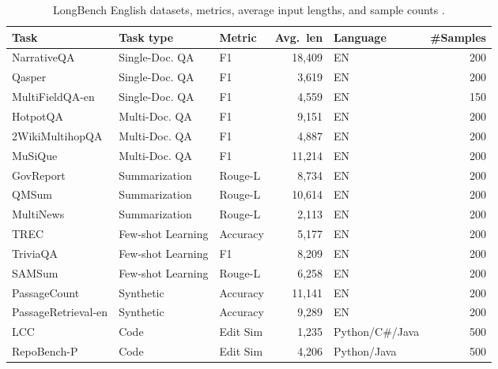 \documentclass{article} %
\begin{document}
\begin{table}[t]
\caption{LongBench English datasets, metrics, average input lengths, and sample counts \citep{bai2024longbench}.}
\label{tab:longbench_datasets}
\centering
\begin{tabular}{lllrlr}
\toprule
Task & Task type & Metric & Avg.\ len & Language & \#Samples \\
\midrule
NarrativeQA & Single-Doc. QA & F1 & 18{,}409 & EN & 200 \\
Qasper & Single-Doc. QA & F1 & 3{,}619 & EN & 200 \\
MultiFieldQA-en & Single-Doc. QA & F1 & 4{,}559 & EN & 150 \\
HotpotQA & Multi-Doc. QA & F1 & 9{,}151 & EN & 200 \\
2WikiMultihopQA & Multi-Doc. QA & F1 & 4{,}887 & EN & 200 \\
MuSiQue & Multi-Doc. QA & F1 & 11{,}214 & EN & 200 \\
GovReport & Summarization & Rouge-L & 8{,}734 & EN & 200 \\
QMSum & Summarization & Rouge-L & 10{,}614 & EN & 200 \\
MultiNews & Summarization & Rouge-L & 2{,}113 & EN & 200 \\
TREC & Few-shot Learning & Accuracy & 5{,}177 & EN & 200 \\
TriviaQA & Few-shot Learning & F1 & 8{,}209 & EN & 200 \\
SAMSum & Few-shot Learning & Rouge-L & 6{,}258 & EN & 200 \\
PassageCount & Synthetic & Accuracy & 11{,}141 & EN & 200 \\
PassageRetrieval-en & Synthetic & Accuracy & 9{,}289 & EN & 200 \\
LCC & Code & Edit Sim & 1{,}235 & Python/C\#/Java & 500 \\
RepoBench-P & Code & Edit Sim & 4{,}206 & Python/Java & 500 \\
\bottomrule
\end{tabular}
\end{table}
\end{document}

